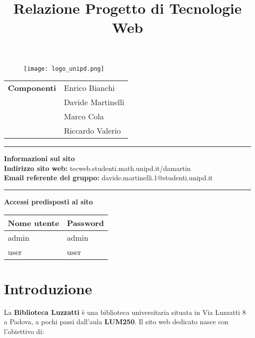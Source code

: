 \documentclass{article}
\title{\textbf{Relazione Progetto di Tecnologie Web}}
\date{}
\newcommand{\componenti}{
    & Enrico Bianchi \\
    & Davide Martinelli \\
    & Marco Cola \\
    & Riccardo Valerio \\
}
\begin{document}
\maketitle

\begin{figure}[H]
    \centering
    \texttt{[image: logo\_unipd.png]}
    \label{fig:logo_unipd}
\end{figure}

\vspace{0.5cm}

\begin{center}
\begin{tabular}{r|l}
    \textbf{Componenti} \componenti 
\end{tabular}

\vspace{1cm}
\rule{\linewidth}{0.2mm}

\vspace{0.3cm}

\textbf{Informazioni sul sito} \\
\textbf{Indirizzo sito web:} tecweb.studenti.math.unipd.it/damartin \\
\textbf{Email referente del gruppo: }davide.martinelli.1@studenti.unipd.it

\vspace{0.3cm}
\rule{\linewidth}{0.2mm}

\vspace{0.5cm}
\textbf{Accessi predisposti al sito}
\begin{table}[h]
    \centering
    \begin{tabular}{|p{5cm}|p{5cm}|}
        \hline
        \rowcolor{gray!30}
        Nome utente & Password \\
        \hline
        admin & admin   \\
        \hline
        user & user   \\
        \hline
    \end{tabular}
\end{table}

\end{center}

\newpage

\tableofcontents        %

\newpage

\section{Introduzione}
La \textbf{Biblioteca Luzzatti} è una biblioteca universitaria situata in Via Luzzatti 8 a Padova, a pochi passi dall'aula \textbf{LUM250}.  
Il sito web dedicato nasce con l'obiettivo di:
\end{document}
